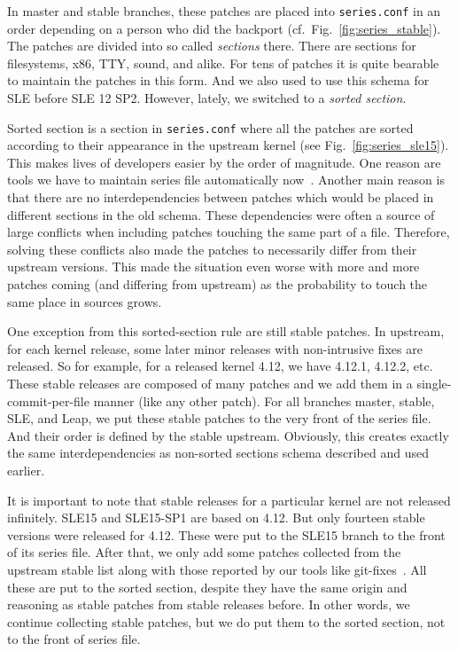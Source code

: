 \documentclass[10pt]{llncs}
\newcommand{\code}[2][]{\lstinline[columns=fullflexible, #1]$#2$}
\newcommand{\file}[2][]{\code[language={}, #1]{#2}}
\begin{document}
In master and stable branches, these patches are placed into
\file{series.conf} in an order depending on a person who did the backport
(cf.\ Fig.\ \ref{fig:series_stable}). The patches are divided into so called
\emph{sections} there. There are sections for filesystems, x86, TTY, sound,
and alike. For tens of patches it is quite bearable to maintain the patches in
this form. And we also used to use this schema for SLE before SLE 12 SP2.
However, lately, we switched to a \emph{sorted section}.

Sorted section is a section in \file{series.conf} where all the patches are
sorted according to their appearance in the upstream kernel (see Fig.\
\ref{fig:series_sle15}). This makes lives of developers easier by the order
of magnitude. One reason are tools we have to maintain series
file automatically now~\cite{sort_series}. Another main reason is that there
are no interdependencies between patches which would be placed in different
sections in the old schema. These dependencies were often a source of large
conflicts when including patches touching the same part of a file. Therefore,
solving these conflicts also made the patches to necessarily differ from their
upstream versions. This made the situation even worse with more and more
patches coming (and differing from upstream) as the probability to touch the
same place in sources grows.

One exception from this sorted-section rule are still stable patches. In
upstream, for each kernel release, some later minor releases with
non-intrusive fixes are released. So for example, for a released kernel 4.12,
we have 4.12.1, 4.12.2, etc. These stable releases are composed of many
patches and we add them in a single-commit-per-file manner (like any other
patch). For all branches master, stable, SLE, and Leap, we put these stable
patches to the very front of the series file. And their order is defined by
the stable upstream.  Obviously, this creates exactly the same
interdependencies as non-sorted sections schema described and used earlier.

It is important to note that stable releases for a particular kernel are not
released infinitely.  SLE15 and SLE15-SP1 are based on 4.12. But only fourteen
stable versions were released for 4.12. These were put to the SLE15 branch to
the front of its series file. After that, we only add some patches collected
from the upstream stable list along with those reported by our tools like
git-fixes~\cite{git_fixes}.  All these are put to the sorted section, despite
they have the same origin and reasoning as stable patches from stable releases
before. In other words, we continue collecting stable patches, but we do put
them to the sorted section, not to the front of series file.
\end{document}
